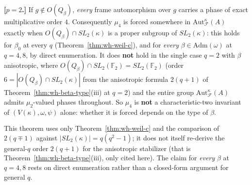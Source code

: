 \statusProvedConditional
\begin{theorem}
\label{thm:wh-weil-d}
\textbf{[$p=2$.]} If $g\notin O(Q_\beta)$, \emph{every} frame automorphism
over $g$ carries a phase of exact multiplicative order $4$. Consequently
$\mu_4$ is forced somewhere in $\mathrm{Aut}_{\mathcal{F}}^\kappa(A)$ exactly
when $O(Q_\beta)\cap SL_2(\kappa)$ is a proper subgroup of $SL_2(\kappa)$:
this holds for $\beta_0$ at every $q$ (Theorem~\ref{thm:wh-weil-c}), and for
\emph{every} $\beta\in\mathrm{Adm}(\omega)$ at $q=4,8$, by direct
enumeration. It does \textbf{not} hold in the single case $q=2$ with $\beta$
anisotropic, where $O(Q_\beta)\cap SL_2(\mathbb{F}_2)=SL_2(\mathbb{F}_2)$
(order $6=|O(Q_\beta)\cap SL_2(\kappa)|$ from the anisotropic formula
$2(q+1)$ of Theorem~\ref{thm:wh-beta-type}(iii) at $q=2$) and the entire
group $\mathrm{Aut}_{\mathcal{F}}^\kappa(A)$ admits $\mu_2$-valued phases
throughout. So $\mu_4$ is \textbf{not} a characteristic-two invariant of
$(V(\kappa),\omega,\psi)$ alone: whether it is forced depends on the type of
$\beta$.
\end{theorem}

\begin{scope}
This theorem uses only Theorem~\ref{thm:wh-weil-c} and the comparison of
$2(q\mp1)$ against $|SL_2(\kappa)|=q(q^2-1)$; it does not itself re-derive
the general-$q$ order $2(q+1)$ for the anisotropic stabilizer (that is
Theorem~\ref{thm:wh-beta-type}(iii), only cited here). The claim for
\emph{every} $\beta$ at $q=4,8$ rests on direct enumeration rather than a
closed-form argument for general $q$.
\end{scope}


